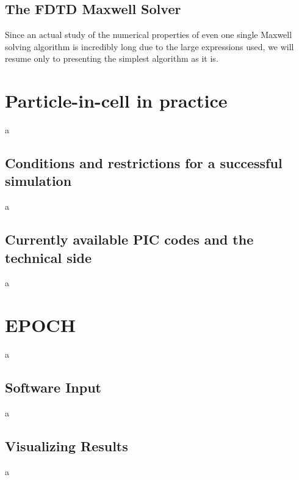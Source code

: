 \documentclass[12pt, class=report, crop=false]{standalone}
\begin{document}
\subsection{The FDTD Maxwell Solver}
Since an actual study of the numerical properties of even one single Maxwell solving algorithm is incredibly long due to the large expressions used, we will resume only to presenting the simplest algorithm as it is.

\section{Particle-in-cell in practice}
a
\subsection{Conditions and restrictions for a successful simulation}
a
\subsection{Currently available PIC codes and the technical side}
a

\section{EPOCH}
a
\subsection{Software Input}
a
\subsection{Visualizing Results}
a
\end{document}
